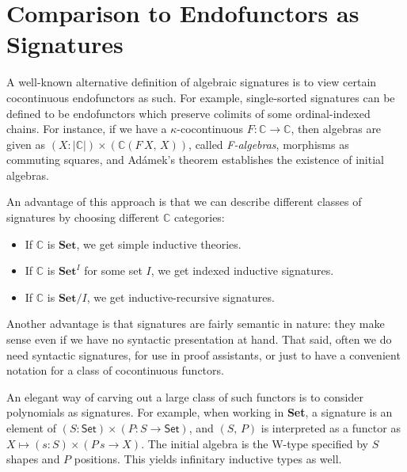 \documentclass[12pt,a4paper,twoside,openany]{book}
\theoremstyle{remark}
\theoremstyle{definition}
\theoremstyle{theorem}
\newcommand{\mbb}[1]{\mathbb{#1}}
\newcommand{\mbf}[1]{\mathbf{#1}}
\newcommand{\Set}{\mathsf{Set}}
\begin{document}

\section{Comparison to Endofunctors as Signatures}

A well-known alternative definition of algebraic signatures is to view certain
cocontinuous endofunctors as such. For example, single-sorted signatures can be
defined to be endofunctors which preserve colimits of some ordinal-indexed
chains. For instance, if we have a $\kappa$-cocontinuous $F : \mbb{C} \to
\mbb{C}$, then algebras are given as $(X : |\mbb{C}|) \times
(\mbb{C}(F\,X,\,X))$, called \emph{F-algebras}, morphisms as commuting squares,
and Adámek's theorem \cite{adamek} establishes the existence of initial
algebras.

An advantage of this approach is that we can describe different classes of
signatures by choosing different $\mbb{C}$ categories:
\begin{itemize}
  \item If $\mbb{C}$ is $\mbf{Set}$, we get simple inductive theories.
  \item If $\mbb{C}$ is $\mbf{Set}^I$ for some set $I$, we get indexed inductive signatures.
  \item If $\mbb{C}$ is $\mbf{Set}/I$, we get inductive-recursive signatures.
\end{itemize}

Another advantage is that signatures are fairly semantic in nature: they make
sense even if we have no syntactic presentation at hand. That said, often we do
need syntactic signatures, for use in proof assistants, or just to have a
convenient notation for a class of cocontinuous functors.

An elegant way of carving out a large class of such functors is to
consider polynomials as signatures. For example, when working in \textbf{Set}, a
signature is an element of $(S : \Set) \times (P : S \to \Set)$, and $(S,\,P)$
is interpreted as a functor as $X \mapsto (s : S) \times (P\,s \to X)$. The
initial algebra is the W-type specified by $S$ shapes and $P$ positions. This
yields infinitary inductive types as well.
\end{document}
